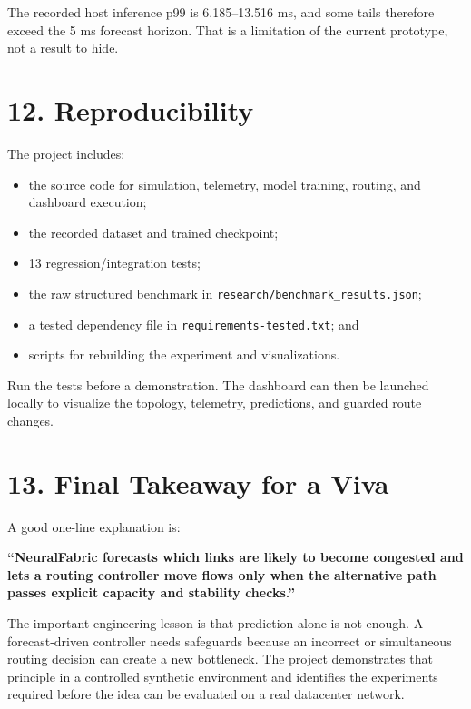 \documentclass[11pt]{article}
\begin{document}
The recorded host inference p99 is 6.185--13.516 ms, and some tails therefore exceed the 5 ms forecast horizon. That is a limitation of the current prototype, not a result to hide.

\section*{12. Reproducibility}
The project includes:
\begin{itemize}[leftmargin=*]
    \item the source code for simulation, telemetry, model training, routing, and dashboard execution;
    \item the recorded dataset and trained checkpoint;
    \item 13 regression/integration tests;
    \item the raw structured benchmark in \texttt{research/benchmark\_results.json};
    \item a tested dependency file in \texttt{requirements-tested.txt}; and
    \item scripts for rebuilding the experiment and visualizations.
\end{itemize}

Run the tests before a demonstration. The dashboard can then be launched locally to visualize the topology, telemetry, predictions, and guarded route changes.

\section*{13. Final Takeaway for a Viva}
A good one-line explanation is:

\textbf{``NeuralFabric forecasts which links are likely to become congested and lets a routing controller move flows only when the alternative path passes explicit capacity and stability checks.''}

The important engineering lesson is that prediction alone is not enough. A forecast-driven controller needs safeguards because an incorrect or simultaneous routing decision can create a new bottleneck. The project demonstrates that principle in a controlled synthetic environment and identifies the experiments required before the idea can be evaluated on a real datacenter network.
\end{document}
